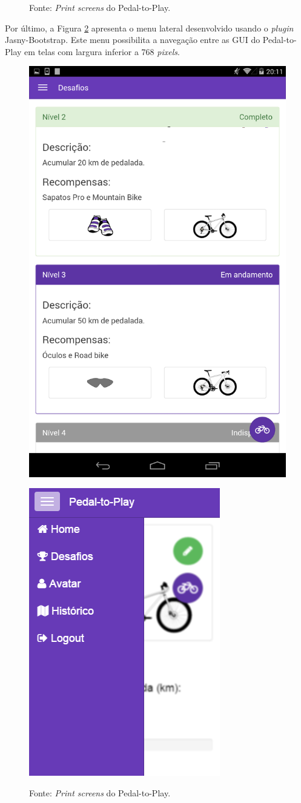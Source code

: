 \begin{figure}[h]
\begin{minipage}{.7\textwidth}
    \label{fig:recordsWeb}
\end{minipage}
\par%
\bigskip
\centerline{Fonte: \textit{Print screens} do Pedal-to-Play.}
\end{figure}

Por último, a Figura \ref{fig:printMenu} apresenta o menu lateral desenvolvido usando o \textit{plugin} Jasny-Bootstrap. Este menu possibilita a navegação entre as GUI do Pedal-to-Play em telas com largura inferior a 768 \textit{pixels}. 

\begin{figure}[hb]
\begin{minipage}{.5\textwidth}
    \centering
    \includegraphics[width=0.5\linewidth]{figuras/p2pQuests.png}
    \label{fig:questsMobile}
\end{minipage}%
\begin{minipage}{.5\textwidth}
    \centering
    \includegraphics[width=0.5\linewidth]{figuras/p2pMenu.png}
    \label{fig:printMenu}
\end{minipage}
\par%
\bigskip
\centerline{Fonte: \textit{Print screens} do Pedal-to-Play.}
\end{figure}

